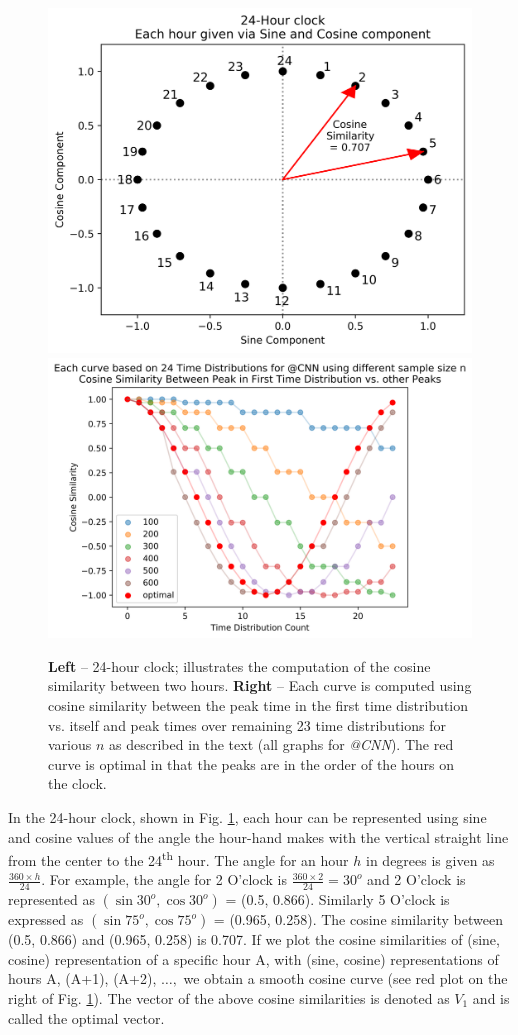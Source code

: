 \begin{figure}[!t]
\centering
\includegraphics[width=.45\textwidth]{Figures/24HourClock.png}\hfill
\includegraphics[width=.55\textwidth]{Figures/CosineDistance.png}
\caption[Cosine Similarity using 24-hour Clock]{\textbf{Left} --  24-hour clock; illustrates the computation of the cosine similarity between two hours. \textbf{Right} -- Each curve is computed using cosine similarity between the peak time in the first time distribution vs. itself and peak times over remaining 23 time distributions for various $n$ as described in the text (all graphs for \emph{@CNN}). The red curve is optimal in that the peaks are in the order of the hours on the clock. 
}
\label{fig_5N}
\end{figure}

In the 24-hour clock, shown in Fig. \ref{fig_5N}, each hour can be represented using sine and cosine values of the angle the hour-hand makes with the vertical straight line from the center to the 24\textsuperscript{th} hour. The angle for an hour $h$ in degrees is given as $\textstyle\frac{360 \times h}{24}$. For example,  the angle for 2 O'clock is $\textstyle\frac{360\times2}{24} = 30^o$  and 2 O'clock is represented as $(\sin 30^o, \cos 30^o)$ = (0.5, 0.866). Similarly 5 O'clock is expressed as $(\sin 75^o, \cos 75^o)$ = (0.965, 0.258). The cosine similarity between (0.5, 0.866) and (0.965, 0.258) is 0.707. If we plot the cosine similarities of (sine, cosine) representation of a specific hour A, with  (sine, cosine) representations of hours A, (A+1), (A+2), $\ldots,$ we obtain a smooth cosine curve (see red plot on the right of Fig. \ref{fig_5N}). The vector of the above cosine similarities is denoted as $V_1$ and is called the optimal vector.


